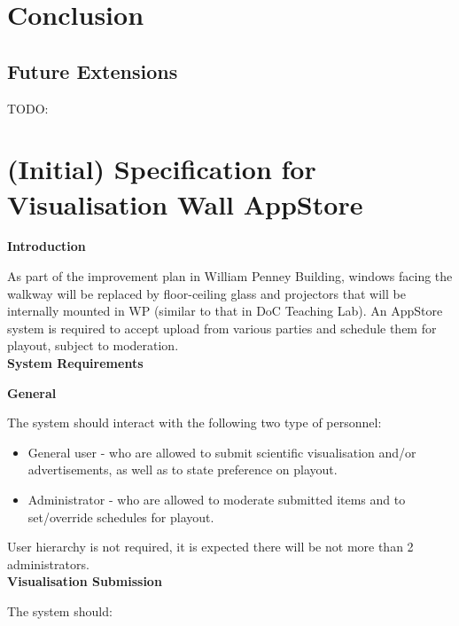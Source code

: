 \documentclass[a4paper, titlepage]{article}
\begin{document}
\newpage
\section{Conclusion}

\subsection{Future Extensions}
TODO:


\newpage
\appendix

\section{(Initial) Specification for Visualisation Wall AppStore}

\textbf{\Large Introduction}

As part of the improvement plan in William Penney Building, windows facing the walkway will be replaced by floor-ceiling glass and projectors that will be internally mounted in WP (similar to that in DoC Teaching Lab). An AppStore system is required to accept upload from various parties and schedule them for playout, subject to moderation.\\

\textbf{\Large System Requirements} \vspace{5pt}

\textbf{\large General}

The system should interact with the following two type of personnel:

\begin{itemize}
  \item General user - who are allowed to submit scientific visualisation and/or advertisements, as well as to state preference on playout.
  \item Administrator - who are allowed to moderate submitted items and to set/override schedules for playout.
\end{itemize}

User hierarchy is not required, it is expected there will be not more than 2 administrators.\\

\textbf{\large Visualisation Submission}

The system should:
\end{document}
